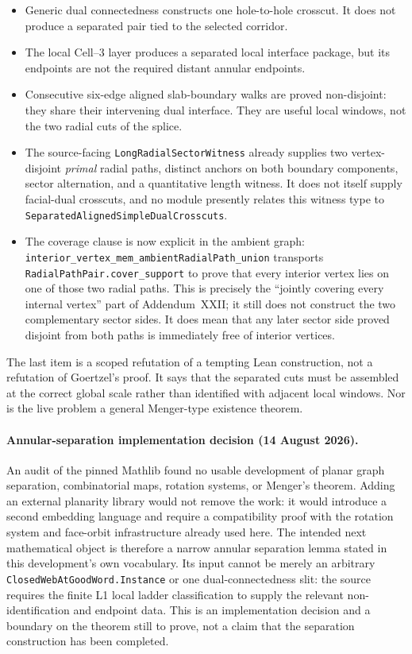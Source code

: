 \documentclass[11pt]{article}
\theoremstyle{definition}
\begin{document}
\begin{itemize}
  \item Generic dual connectedness constructs one hole-to-hole crosscut.  It
        does not produce a separated pair tied to the selected corridor.
  \item The local Cell--3 layer produces a separated local interface package,
        but its endpoints are not the required distant annular endpoints.
  \item Consecutive six-edge aligned slab-boundary walks are proved
        non-disjoint: they share their intervening dual interface.  They are
        useful local windows, not the two radial cuts of the splice.
  \item The source-facing \texttt{LongRadialSectorWitness} already supplies
        two vertex-disjoint \emph{primal} radial paths, distinct anchors on
        both boundary components, sector alternation, and a quantitative
        length witness.  It does not itself supply facial-dual crosscuts, and
        no module presently relates this witness type to
        \texttt{SeparatedAlignedSimpleDualCrosscuts}.
  \item The coverage clause is now explicit in the ambient graph:
        \texttt{interior\_vertex\_mem\_ambientRadialPath\_union} transports
        \texttt{RadialPathPair.cover\_support} to prove that every interior
        vertex lies on one of those two radial paths.  This is precisely the
        ``jointly covering every internal vertex'' part of Addendum~XXII; it
        still does not construct the two complementary sector sides.  It does
        mean that any later sector side proved disjoint from both paths is
        immediately free of interior vertices.
\end{itemize}

The last item is a scoped refutation of a tempting Lean construction, not a
refutation of Goertzel's proof.  It says that the separated cuts must be
assembled at the correct global scale rather than identified with adjacent
local windows.  Nor is the live problem a general Menger-type existence
theorem.

\paragraph{Annular-separation implementation decision (14 August 2026).}
An audit of the pinned Mathlib found no usable development of planar graph
separation, combinatorial maps, rotation systems, or Menger's theorem.  Adding
an external planarity library would not remove the work: it would introduce a
second embedding language and require a compatibility proof with the rotation
system and face-orbit infrastructure already used here.  The intended next
mathematical object is therefore a narrow annular separation lemma stated in
this development's own vocabulary.  Its input cannot be merely an arbitrary
\texttt{ClosedWebAtGoodWord.Instance} or one dual-connectedness slit: the
source requires the finite L1 local ladder classification to supply the
relevant non-identification and endpoint data.  This is an implementation
decision and a boundary on the theorem still to prove, not a claim that the
separation construction has been completed.
\end{document}
